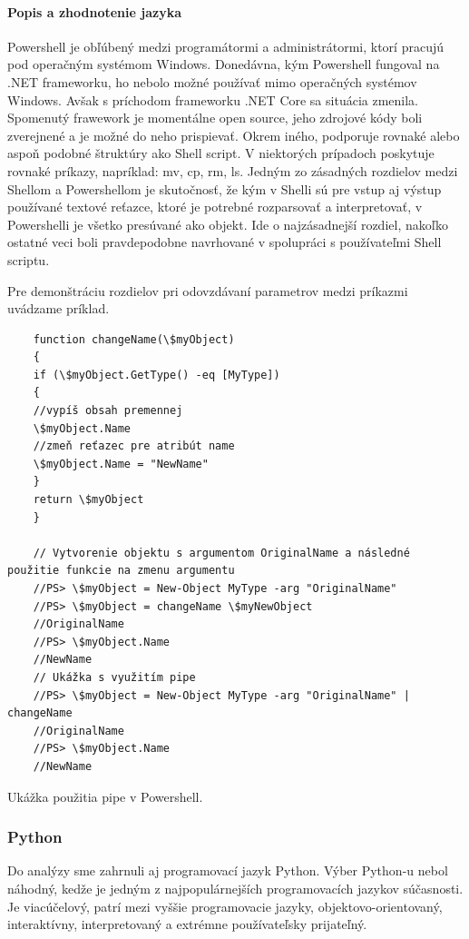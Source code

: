 \paragraph{Popis a zhodnotenie jazyka}
Powershell je obľúbený medzi programátormi a administrátormi, ktorí pracujú pod operačným systémom Windows. Donedávna, kým Powershell fungoval na .NET frameworku, ho nebolo možné používať mimo operačných systémov Windows. Avšak s príchodom frameworku .NET Core sa situácia zmenila. Spomenutý frawework je momentálne open source, jeho zdrojové kódy boli zverejnené a je možné do neho prispievať. Okrem iného, podporuje rovnaké alebo aspoň podobné štruktúry ako Shell script. V niektorých prípadoch poskytuje rovnaké príkazy, napríklad: mv, cp, rm, ls. Jedným zo zásadných rozdielov medzi Shellom a Powershellom je skutočnosť, že kým v Shelli sú pre vstup aj výstup používané textové reťazce, ktoré je potrebné rozparsovať a interpretovať, v Powershelli je všetko presúvané ako objekt. Ide o najzásadnejší rozdiel, nakoľko ostatné veci boli pravdepodobne navrhované v spolupráci s používateľmi Shell scriptu. \cite{psbook}

Pre demonštráciu rozdielov pri odovzdávaní parametrov medzi príkazmi uvádzame príklad.
\newpage
\begin{algorithm}[H]
	\begin{verbatim}
	function changeName(\$myObject)
	{
	if (\$myObject.GetType() -eq [MyType])
	{
	//vypíš obsah premennej
	\$myObject.Name
	//zmeň reťazec pre atribút name
	\$myObject.Name = "NewName"
	}
	return \$myObject
	}
	
	// Vytvorenie objektu s argumentom OriginalName a následné použitie funkcie na zmenu argumentu
	//PS> \$myObject = New-Object MyType -arg "OriginalName"
	//PS> \$myObject = changeName \$myNewObject
	//OriginalName
	//PS> \$myObject.Name
	//NewName
	// Ukážka s využitím pipe
	//PS> \$myObject = New-Object MyType -arg "OriginalName" | changeName
	//OriginalName
	//PS> \$myObject.Name
	//NewName
	\end{verbatim}
	\caption{Ukážka použitia pipe v Powershell. \cite{netalg}}
	\label{alg:gen}
\end{algorithm}

\subsubsection{Python}
\indent Do analýzy sme zahrnuli aj programovací jazyk Python. Výber Python-u nebol náhodný, kedže je jedným z najpopulárnejších programovacích jazykov súčasnosti. Je viacúčelový, patrí mezi vyššie programovacie jazyky, objektovo-orientovaný, interaktívny, interpretovaný a extrémne používateľsky prijateľný.\cite{python}
